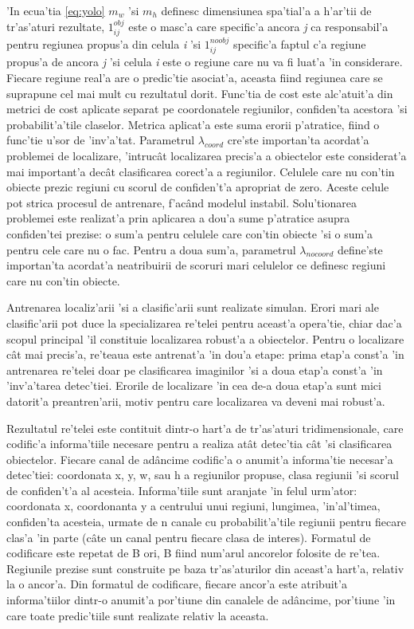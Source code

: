 \documentclass[12pt,a4paper,twoside]{report}
\begin{document}
'In ecua'tia \ref{eq:yolo} $m_w$ 'si $m_h$ definesc dimensiunea spa'tial'a a h'ar'tii de tr'as'aturi rezultate, $1_{ij}^{obj}$ este o masc'a care specific'a ancora \textit{j} ca responsabil'a pentru regiunea propus'a din celula \textit{i} 'si $1_{ij}^{noobj}$ specific'a faptul c'a regiune propus'a de ancora \textit{j} 'si celula \textit{i} este o regiune care nu va fi luat'a 'in considerare. Fiecare regiune real'a are o predic'tie asociat'a, aceasta fiind regiunea care se suprapune cel mai mult cu rezultatul dorit. Func'tia de cost este alc'atuit'a din metrici de cost aplicate separat pe coordonatele regiunilor, confiden'ta acestora 'si probabilit'a'tile claselor. Metrica aplicat'a este suma erorii p'atratice, fiind o func'tie u'sor de 'inv'a'tat. Parametrul $\lambda_{coord}$ cre'ste importan'ta acordat'a problemei de localizare, 'intruc\^at localizarea precis'a a obiectelor este considerat'a mai important'a dec\^at clasificarea corect'a a regiunilor. Celulele care nu con'tin obiecte prezic regiuni cu scorul de confiden't'a apropriat de zero.  Aceste celule pot strica procesul de antrenare, f'ac\^and modelul instabil. Solu'tionarea problemei este realizat'a prin aplicarea a dou'a sume p'atratice asupra confiden'tei prezise: o sum'a pentru celulele care con'tin obiecte 'si o sum'a pentru cele care nu o fac. Pentru a doua sum'a, parametrul $\lambda_{nocoord}$ define'ste importan'ta acordat'a neatribuirii de scoruri mari celulelor ce definesc regiuni care nu con'tin obiecte.

Antrenarea localiz'arii 'si a clasific'arii sunt realizate simulan. Erori mari ale clasific'arii pot duce la specializarea re'telei pentru aceast'a opera'tie, chiar dac'a scopul principal 'il constituie localizarea robust'a a obiectelor. Pentru o localizare c\^at mai precis'a, re'teaua este antrenat'a 'in dou'a etape: prima etap'a const'a 'in antrenarea re'telei doar pe clasificarea imaginilor 'si a doua etap'a const'a 'in 'inv'a'tarea detec'tiei. Erorile de localizare 'in cea de-a doua etap'a sunt mici datorit'a preantren'arii, motiv pentru care localizarea va deveni mai robust'a.

Rezultatul re'telei este contituit dintr-o hart'a de tr'as'aturi tridimensionale, care codific'a informa'tiile necesare pentru a realiza at\^at detec'tia c\^at 'si
clasificarea obiectelor. Fiecare canal de ad\^ancime codific'a o anumit'a informa'tie necesar'a detec'tiei: coordonata x, y, w, sau h a regiunilor propuse, clasa regiunii 'si scorul de confiden't'a al acesteia. Informa'tiile sunt aranjate 'in felul urm'ator: coordonata x, coordonanta y a centrului unui regiuni, lungimea, 'in'al'timea, confiden'ta acesteia, urmate de n canale cu probabilit'a'tile regiunii pentru fiecare clas'a 'in parte (c\^ate un canal pentru fiecare clasa de interes). Formatul de codificare este repetat de B ori, B fiind num'arul ancorelor folosite de re'tea. Regiunile prezise sunt construite pe baza tr'as'aturilor din aceast'a hart'a, relativ la o ancor'a. Din formatul de codificare, fiecare ancor'a este atribuit'a informa'tiilor dintr-o anumit'a por'tiune din canalele de ad\^ancime, por'tiune 'in care toate predic'tiile sunt realizate relativ la aceasta.
\end{document}
